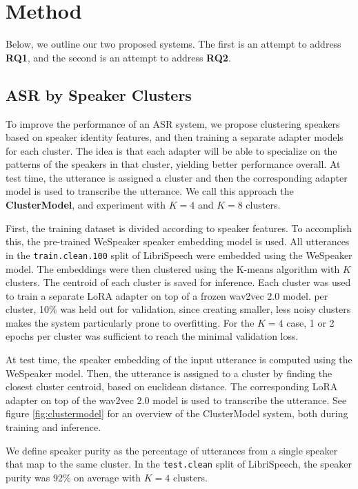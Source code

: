 \section{Method}

Below, we outline our two proposed systems. The first is an attempt to address \textbf{RQ1}, and the second is an attempt to address \textbf{RQ2}.

\subsection{ASR by Speaker Clusters}

To improve the performance of an ASR system, we propose clustering speakers based on speaker identity features, 
and then training a separate adapter models for each cluster.
The idea is that each adapter will be able to specialize on the patterns of the speakers in that cluster, yielding better performance overall.
At test time, the utterance is assigned a cluster and then the corresponding adapter model is used to transcribe the utterance.
We call this approach the \textbf{ClusterModel}, and experiment with $K=4$ and $K=8$ clusters.

First, the training dataset is divided according to speaker features. To accomplish this, the pre-trained WeSpeaker \cite{wespeaker} speaker embedding model is used.
All utterances in the \verb|train.clean.100| split of LibriSpeech \cite{librispeech} were embedded using the WeSpeaker model.
The embeddings were then clustered using the K-means algorithm with $K$ clusters. 
The centroid of each cluster is saved for inference.
Each cluster was used to train a separate LoRA adapter on top of a frozen wav2vec 2.0 \cite{wav2vec2} model.
per cluster, 10\% was held out for validation, since creating smaller, less noisy clusters makes the system particularly prone to overfitting.
For the $K=4$ case, 1 or 2 epochs per cluster was sufficient to reach the minimal validation loss.

At test time, the speaker embedding of the input utterance is computed using the WeSpeaker model.
Then, the utterance is assigned to a cluster by finding the closest cluster centroid, based on euclidean distance.
The corresponding LoRA adapter on top of the wav2vec 2.0 model is used to transcribe the utterance.
See figure \ref{fig:clustermodel} for an overview of the ClusterModel system, both during training and inference.

We define speaker purity as the percentage of utterances from a single speaker that map to the same cluster.
In the \verb|test.clean| split of LibriSpeech, the speaker purity was 92\% on average with $K=4$ clusters.

